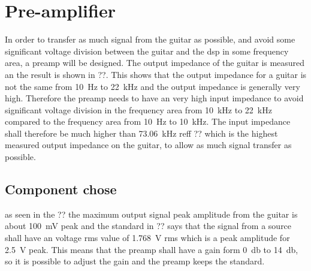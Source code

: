 \section{Pre-amplifier}
In order to transfer as much signal from the guitar as possible, and avoid some significant voltage division between the guitar and the \gls{dsp} in some frequency area, a \gls{preamp} will be designed. The output impedance of the guitar is measured an the result is shown in ??. This shows that the output impedance for a guitar is not the same from \SI{10}{\hertz} to \SI{22}{\kilo\hertz} and the output impedance is generally very high. Therefore the \gls{preamp} needs to have an very high input impedance to avoid significant voltage division in the frequency area from \SI{10}{\kilo\hertz} to \SI{22}{\kilo\hertz} compared to the frequency area from \SI{10}{\hertz} to \SI{10}{\kilo\hertz}. The input impedance shall therefore be much higher than \SI{73.06}{\kilo\hertz} reff ?? which is the highest measured output impedance on the guitar, to allow as much signal transfer as possible.

\subsection{Component chose}

as seen in the ?? the maximum output signal peak amplitude from the guitar is about \SI{100}{\milli\volt} peak and the standard in ?? says that the signal from a source shall have an voltage \gls{rms} value of \SI{1.768}{\volt} \gls{rms} which is a peak amplitude for \SI{2.5}{\volt} peak. This means that the \gls{preamp} shall have a gain form \SI{0}{\decibel} to \SI{14}{\decibel}, so it is possible to adjust the gain and the \gls{preamp} keeps the standard. 